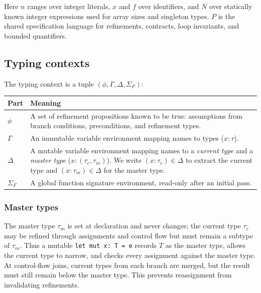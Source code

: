 Here $n$ ranges over integer literals, $x$ and $f$ over identifiers, and $N$ over statically known integer expressions used for array sizes and singleton types. $P$ is the shared specification language for refinements, contracts, loop invariants, and bounded quantifiers.

\subsection{Typing contexts}\label{sec:typing-contexts}

The typing context is a tuple $(\phi, \Gamma, \Delta, \Sigma_F)$:

\begin{center}
\small
\begin{tabularx}{0.95\textwidth}{>{\raggedright\arraybackslash}p{} >{\raggedright\arraybackslash}X}
\toprule
\textbf{Part} & \textbf{Meaning} \\
\midrule
$\phi$ & A set of refinement propositions known to be true: assumptions from branch conditions, preconditions, and refinement types. \\
$\Gamma$ & An immutable variable environment mapping names to types ($x : \tau$). \\
$\Delta$ & A mutable variable environment mapping names to a \textit{current type} and a \textit{master type} ($x : (\tau_c, \tau_m)$). We write $(x: \tau_c) \in \Delta$ to extract the current type and $(x: \tau_m) \in \Delta$ for the master type. \\
$\Sigma_F$ & A global function signature environment, read-only after an initial pass. \\
\bottomrule
\end{tabularx}
\end{center}

\subsubsection{Master types}

The master type $\tau_m$ is set at declaration and never changes; the current type $\tau_c$ may be refined through assignments and control flow but must remain a subtype of $\tau_m$. Thus a mutable \texttt{let mut x: T = e} records $T$ as the master type, allows the current type to narrow, and checks every assignment against the master type. At control-flow joins, current types from each branch are merged, but the result must still remain below the master type. This prevents reassignment from invalidating refinements.

